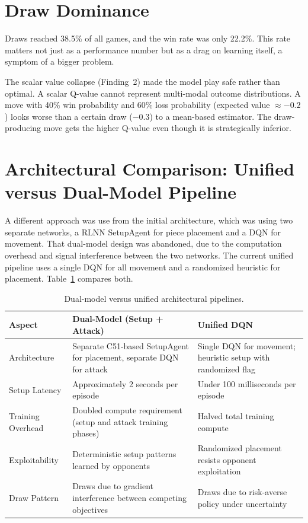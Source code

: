 \section{Draw Dominance}

Draws reached 38.5\% of all games, and the win rate was only 22.2\%. This rate matters not just as a performance number but as a drag on learning itself, a symptom of a bigger problem.

The scalar value collapse (Finding~2) made the model play safe rather than optimal. A scalar Q-value cannot represent multi-modal outcome distributions. A move with 40\% win probability and 60\% loss probability (expected value $\approx -0.2$) looks worse than a certain draw ($-0.3$) to a mean-based estimator. The draw-producing move gets the higher Q-value even though it is strategically inferior.

\section{Architectural Comparison: Unified versus Dual-Model Pipeline}

A different approach was use from the initial architecture, which was using two separate networks, a RLNN SetupAgent for piece placement and a DQN for movement. That dual-model design was abandoned, due to the computation overhead and signal interference between the two networks. The current unified pipeline uses a single DQN for all movement and a randomized heuristic for placement. Table~\ref{tab:architecture_comparison} compares both.

\begin{table}[htbp]
    \centering
    \caption{Dual-model versus unified architectural pipelines.}
    \label{tab:architecture_comparison}
    \begin{tabular}{|p{3cm}|p{5.5cm}|p{5.5cm}|}
        \hline
        \textbf{Aspect} & \textbf{Dual-Model (Setup + Attack)} & \textbf{Unified DQN} \\
        \hline
        Architecture & Separate C51-based SetupAgent for placement, separate DQN for attack & Single DQN for movement; heuristic setup with randomized flag \\
        \hline
        Setup Latency & Approximately 2 seconds per episode & Under 100 milliseconds per episode \\
        \hline
        Training Overhead & Doubled compute requirement (setup and attack training phases) & Halved total training compute \\
        \hline
        Exploitability & Deterministic setup patterns learned by opponents & Randomized placement resists opponent exploitation \\
        \hline
        Draw Pattern & Draws due to gradient interference between competing objectives & Draws due to risk-averse policy under uncertainty \\
        \hline
    \end{tabular}
\end{table}

